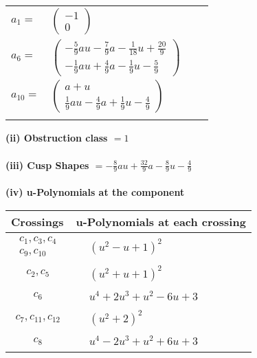 \documentclass[1p]{elsarticle_modified}
\theoremstyle{definition}
\begin{document}
\begin{tabular}{m{7pt} m{180pt} m{7pt} m{180pt} }
\flushright $a_{1}=$&$\begin{pmatrix}-1\\0\end{pmatrix}$ \\
\flushright $a_{6}=$&$\begin{pmatrix}-\frac{5}{9} a u-\frac{7}{9} a-\frac{1}{18} u+\frac{20}{9}\\-\frac{1}{9} a u+\frac{4}{9} a-\frac{1}{9} u-\frac{5}{9}\end{pmatrix}$ \\
\flushright $a_{10}=$&$\begin{pmatrix}a+u\\\frac{1}{9} a u-\frac{4}{9} a+\frac{1}{9} u-\frac{4}{9}\end{pmatrix}$\\&\end{tabular}
\flushleft \textbf{(ii) Obstruction class $= 1$}\\~\\
\flushleft \textbf{(iii) Cusp Shapes $= -\frac{8}{9} a u+\frac{32}{9} a-\frac{8}{9} u-\frac{4}{9}$}\\~\\
\newpage\renewcommand{\arraystretch}{1}
\flushleft \textbf{(iv) u-Polynomials at the component}\newline \\
\begin{tabular}{m{50pt}|m{274pt}}
Crossings & \hspace{64pt}u-Polynomials at each crossing \\
\hline $$\begin{aligned}c_{1},c_{3},c_{4}\\c_{9},c_{10}\end{aligned}$$&$\begin{aligned}
&(u^2- u+1)^2
\end{aligned}$\\
\hline $$\begin{aligned}c_{2},c_{5}\end{aligned}$$&$\begin{aligned}
&(u^2+u+1)^2
\end{aligned}$\\
\hline $$\begin{aligned}c_{6}\end{aligned}$$&$\begin{aligned}
&u^4+2 u^3+u^2-6 u+3
\end{aligned}$\\
\hline $$\begin{aligned}c_{7},c_{11},c_{12}\end{aligned}$$&$\begin{aligned}
&(u^2+2)^2
\end{aligned}$\\
\hline $$\begin{aligned}c_{8}\end{aligned}$$&$\begin{aligned}
&u^4-2 u^3+u^2+6 u+3
\end{aligned}$\\
\hline
\end{tabular}\\~\\
\end{document}
